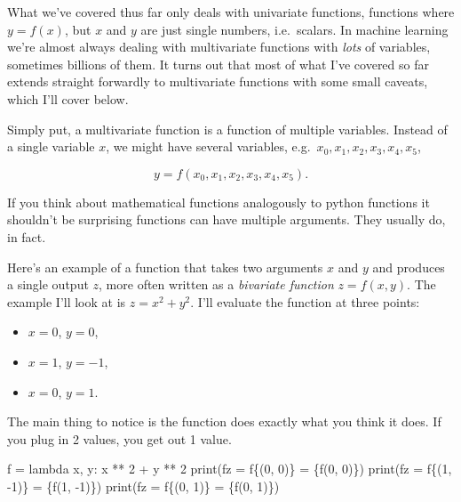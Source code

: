 \documentclass[
  letterpaper,
  DIV=11,
  numbers=noendperiod]{scrreprt}
\newenvironment{Shaded}{\begin{snugshade}}{\end{snugshade}}
\newcommand{\BuiltInTok}[1]{\textcolor[rgb]{0.00,0.23,0.31}{#1}}
\newcommand{\DecValTok}[1]{\textcolor[rgb]{0.68,0.00,0.00}{#1}}
\newcommand{\KeywordTok}[1]{\textcolor[rgb]{0.00,0.23,0.31}{#1}}
\newcommand{\NormalTok}[1]{\textcolor[rgb]{0.00,0.23,0.31}{#1}}
\newcommand{\OperatorTok}[1]{\textcolor[rgb]{0.37,0.37,0.37}{#1}}
\newcommand{\SpecialCharTok}[1]{\textcolor[rgb]{0.37,0.37,0.37}{#1}}
\newcommand{\SpecialStringTok}[1]{\textcolor[rgb]{0.13,0.47,0.30}{#1}}
\providecommand{\tightlist}{%
  \setlength{\itemsep}{0pt}\setlength{\parskip}{0pt}}\usepackage{longtable,booktabs,array}
\begin{document}
What we've covered thus far only deals with univariate functions,
functions where \(y=f(x)\), but \(x\) and \(y\) are just single numbers,
i.e.~scalars. In machine learning we're almost always dealing with
multivariate functions with \emph{lots} of variables, sometimes billions
of them. It turns out that most of what I've covered so far extends
straight forwardly to multivariate functions with some small caveats,
which I'll cover below.

Simply put, a multivariate function is a function of multiple variables.
Instead of a single variable \(x\), we might have several variables,
e.g.~\(x_0, x_1, x_2, x_3, x_4, x_5\),

\[y = f(x_0, x_1, x_2, x_3, x_4, x_5).\]

If you think about mathematical functions analogously to python
functions it shouldn't be surprising functions can have multiple
arguments. They usually do, in fact.

Here's an example of a function that takes two arguments \(x\) and \(y\)
and produces a single output \(z\), more often written as a
\emph{bivariate function} \(z=f(x,y)\). The example I'll look at is
\(z = x^2 + y^2\). I'll evaluate the function at three points:

\begin{itemize}
\tightlist
\item
  \(x=0\), \(y=0\),
\item
  \(x=1\), \(y=-1\),
\item
  \(x=0\), \(y=1\).
\end{itemize}

The main thing to notice is the function does exactly what you think it
does. If you plug in 2 values, you get out 1 value.

\begin{Shaded}
\begin{Highlighting}[]
\NormalTok{f }\OperatorTok{=} \KeywordTok{lambda}\NormalTok{ x, y: x }\OperatorTok{**} \DecValTok{2} \OperatorTok{+}\NormalTok{ y }\OperatorTok{**} \DecValTok{2}
\BuiltInTok{print}\NormalTok{(}\SpecialStringTok{f\textquotesingle{}z = f}\SpecialCharTok{\{}\NormalTok{(}\DecValTok{0}\NormalTok{, }\DecValTok{0}\NormalTok{)}\SpecialCharTok{\}}\SpecialStringTok{ = }\SpecialCharTok{\{}\NormalTok{f(}\DecValTok{0}\NormalTok{, }\DecValTok{0}\NormalTok{)}\SpecialCharTok{\}}\SpecialStringTok{\textquotesingle{}}\NormalTok{)}
\BuiltInTok{print}\NormalTok{(}\SpecialStringTok{f\textquotesingle{}z = f}\SpecialCharTok{\{}\NormalTok{(}\DecValTok{1}\NormalTok{, }\OperatorTok{{-}}\DecValTok{1}\NormalTok{)}\SpecialCharTok{\}}\SpecialStringTok{ = }\SpecialCharTok{\{}\NormalTok{f(}\DecValTok{1}\NormalTok{, }\OperatorTok{{-}}\DecValTok{1}\NormalTok{)}\SpecialCharTok{\}}\SpecialStringTok{\textquotesingle{}}\NormalTok{)}
\BuiltInTok{print}\NormalTok{(}\SpecialStringTok{f\textquotesingle{}z = f}\SpecialCharTok{\{}\NormalTok{(}\DecValTok{0}\NormalTok{, }\DecValTok{1}\NormalTok{)}\SpecialCharTok{\}}\SpecialStringTok{ = }\SpecialCharTok{\{}\NormalTok{f(}\DecValTok{0}\NormalTok{, }\DecValTok{1}\NormalTok{)}\SpecialCharTok{\}}\SpecialStringTok{\textquotesingle{}}\NormalTok{)}
\end{Highlighting}
\end{Shaded}
\end{document}
